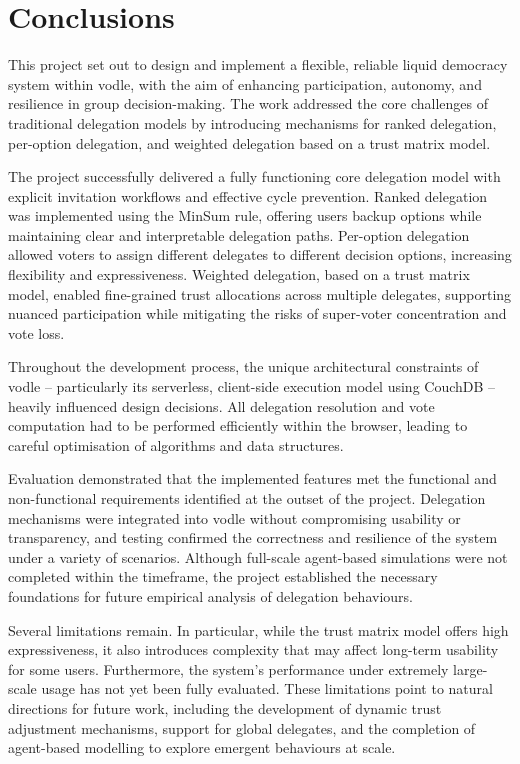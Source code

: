 \chapter{Conclusions}\label{ch:conclusions}
This project set out to design and implement a flexible, reliable liquid democracy system within vodle, with the aim of enhancing participation, autonomy, and resilience in group decision-making. The work addressed the core challenges of traditional delegation models by introducing mechanisms for ranked delegation, per-option delegation, and weighted delegation based on a trust matrix model.

The project successfully delivered a fully functioning core delegation model with explicit invitation workflows and effective cycle prevention. Ranked delegation was implemented using the MinSum rule, offering users backup options while maintaining clear and interpretable delegation paths. Per-option delegation allowed voters to assign different delegates to different decision options, increasing flexibility and expressiveness. Weighted delegation, based on a trust matrix model, enabled fine-grained trust allocations across multiple delegates, supporting nuanced participation while mitigating the risks of super-voter concentration and vote loss.

Throughout the development process, the unique architectural constraints of vodle -- particularly its serverless, client-side execution model using CouchDB -- heavily influenced design decisions. All delegation resolution and vote computation had to be performed efficiently within the browser, leading to careful optimisation of algorithms and data structures.

Evaluation demonstrated that the implemented features met the functional and non-functional requirements identified at the outset of the project. Delegation mechanisms were integrated into vodle without compromising usability or transparency, and testing confirmed the correctness and resilience of the system under a variety of scenarios. Although full-scale agent-based simulations were not completed within the timeframe, the project established the necessary foundations for future empirical analysis of delegation behaviours.

Several limitations remain. In particular, while the trust matrix model offers high expressiveness, it also introduces complexity that may affect long-term usability for some users. Furthermore, the system's performance under extremely large-scale usage has not yet been fully evaluated. These limitations point to natural directions for future work, including the development of dynamic trust adjustment mechanisms, support for global delegates, and the completion of agent-based modelling to explore emergent behaviours at scale.


